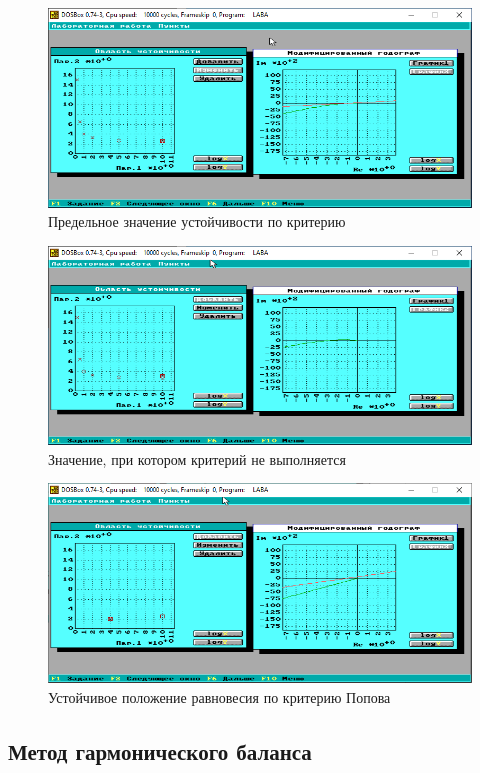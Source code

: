	\begin{figure}
		\centering\includegraphics[width=.85\textwidth]{png/1.png}
		\caption{Предельное значение устойчивости по критерию}
		\label{popov1}
	\end{figure}
	
	\begin{figure}
		\centering\includegraphics[width=.85\textwidth]{png/2.png}
		\caption{Значение, при котором критерий не выполняется}
		\label{popov2}
	\end{figure}
	
	\begin{figure}
		\centering\includegraphics[width=.85\textwidth]{png/3.png}
		\caption{Устойчивое положение равновесия по критерию Попова}
		\label{popov3}
	\end{figure}
	
	\subsection{Метод гармонического баланса}
	
